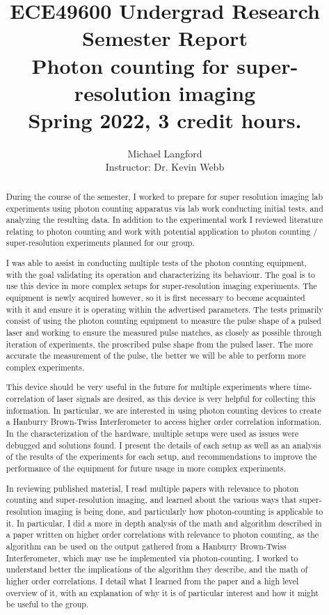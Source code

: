 \documentclass[a4paper]{article}
\title{ECE49600 Undergrad Research Semester Report \\
  \large Photon counting for super-resolution imaging \\
  \large Spring 2022, 3 credit hours.  }
\author{Michael Langford \newline \\
        Instructor: Dr. Kevin Webb}
\begin{document}
\maketitle

\begin{abstract}
During the course of the semester, I worked to prepare for super resolution imaging lab experiments using photon counting apparatus via lab work conducting initial tests, and analyzing the resulting data. In addition to the experimental work I reviewed literature relating to photon counting and work with potential application to photon counting / super-resolution experiments planned for our group.

I was able to assist in conducting multiple tests of the photon counting equipment, with the goal validating its operation and characterizing its behaviour. The goal is to use this device in more complex setups for super-resolution imaging experiments. The equipment is newly acquired however, so it is first necessary to become acquainted with it and ensure it is operating within the advertised parameters. 
The tests primarily consist of using the photon counting equipment to measure the pulse shape of a pulsed laser and working to ensure the measured pulse matches, as closely as possible through iteration of experiments, the proscribed pulse shape from the pulsed laser. The more accurate the measurement of the pulse, the better we will be able to perform more complex experiments.

This device should be very useful in the future for multiple experiments where time-correlation of laser signals are desired, as this device is very helpful for collecting this information. In particular, we are interested in using photon counting devices to create a Hanburry Brown-Twiss Interferometer to access higher order correlation information. 
In the characterization of the hardware, multiple setups were used as issues were debugged and solutions found. I present the details of each setup as well as an analysis of the results of the experiments for each setup, and recommendations to improve the performance of the equipment for future usage in more complex experiments.

In reviewing published material, I read multiple papers with relevance to photon counting and super-resolution imaging, and learned about the various ways that super-resolution imaging is being done, and particularly how photon-counting is applicable to it.
In particular, I did a more in depth analysis of the math and algorithm described in a paper written on higher order correlations with relevance to photon counting, as the algorithm can be used on the output gathered from a Hanburry Brown-Twiss Interferometer, which may use be implemented via photon-counting. I worked to understand better the implications of the algorithm they describe, and the math of higher order correlations.
I detail what I learned from the paper and a high level overview of it, with an explanation of why it is of particular interest and how it might be useful to the group.

\end{abstract}
\end{document}
